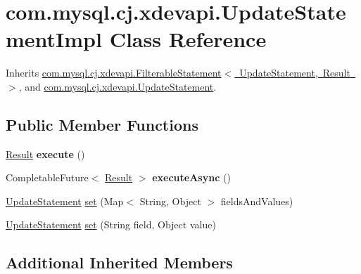 \hypertarget{classcom_1_1mysql_1_1cj_1_1xdevapi_1_1_update_statement_impl}{}\section{com.\+mysql.\+cj.\+xdevapi.\+Update\+Statement\+Impl Class Reference}
\label{classcom_1_1mysql_1_1cj_1_1xdevapi_1_1_update_statement_impl}


Inherits \mbox{\hyperlink{classcom_1_1mysql_1_1cj_1_1xdevapi_1_1_filterable_statement}{com.\+mysql.\+cj.\+xdevapi.\+Filterable\+Statement$<$ Update\+Statement, Result $>$}}, and \mbox{\hyperlink{interfacecom_1_1mysql_1_1cj_1_1xdevapi_1_1_update_statement}{com.\+mysql.\+cj.\+xdevapi.\+Update\+Statement}}.

\subsection*{Public Member Functions}
\begin{DoxyCompactItemize}
\item 
\mbox{\label{classcom_1_1mysql_1_1cj_1_1xdevapi_1_1_update_statement_impl_a788b498a7eaccac3a60041232221b24a}} 
\mbox{\hyperlink{interfacecom_1_1mysql_1_1cj_1_1xdevapi_1_1_result}{Result}} {\bfseries execute} ()
\item 
\mbox{\label{classcom_1_1mysql_1_1cj_1_1xdevapi_1_1_update_statement_impl_abf6e7151f999adf63e8302a46f389887}} 
Completable\+Future$<$ \mbox{\hyperlink{interfacecom_1_1mysql_1_1cj_1_1xdevapi_1_1_result}{Result}} $>$ {\bfseries execute\+Async} ()
\item 
\mbox{\hyperlink{interfacecom_1_1mysql_1_1cj_1_1xdevapi_1_1_update_statement}{Update\+Statement}} \mbox{\hyperlink{classcom_1_1mysql_1_1cj_1_1xdevapi_1_1_update_statement_impl_ad3e9fc6db7805042b6f73938782c2173}{set}} (Map$<$ String, Object $>$ fields\+And\+Values)
\item 
\mbox{\hyperlink{interfacecom_1_1mysql_1_1cj_1_1xdevapi_1_1_update_statement}{Update\+Statement}} \mbox{\hyperlink{classcom_1_1mysql_1_1cj_1_1xdevapi_1_1_update_statement_impl_a6100d1574e2958c9aa1229e70a476e37}{set}} (String field, Object value)
\end{DoxyCompactItemize}
\subsection*{Additional Inherited Members}


